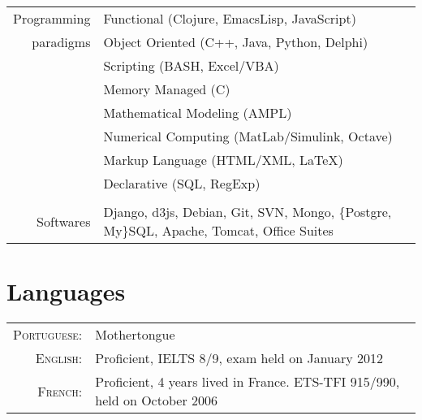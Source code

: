 \documentclass[a4paper,10pt]{article} %
\begin{document}
\begin{tabular}{rp{11cm}}
Programming & Functional (Clojure, EmacsLisp, JavaScript)\\
paradigms & Object Oriented (C++, Java, Python, Delphi)\\
& Scripting (BASH, Excel/VBA)\\
& Memory Managed (C)\\
& Mathematical Modeling (AMPL) \\
& Numerical Computing (MatLab/Simulink, Octave) \\
& Markup Language (HTML/XML, LaTeX) \\
& Declarative (SQL, RegExp) \\
&\\

Softwares &
Django, d3js, Debian, Git, SVN, Mongo, \{Postgre, My\}SQL,
Apache, Tomcat, Office Suites \\




\end{tabular}


\section{Languages}

\begin{tabular}{rl}
  \textsc{Portuguese:} &
  Mothertongue\\

  \textsc{English:} &
  Proficient, IELTS 8/9, exam held on January 2012\\

  \textsc{French:} &
  Proficient, 4 years lived in France. ETS-TFI 915/990, held on October 2006\\



\end{tabular}
\end{document}
